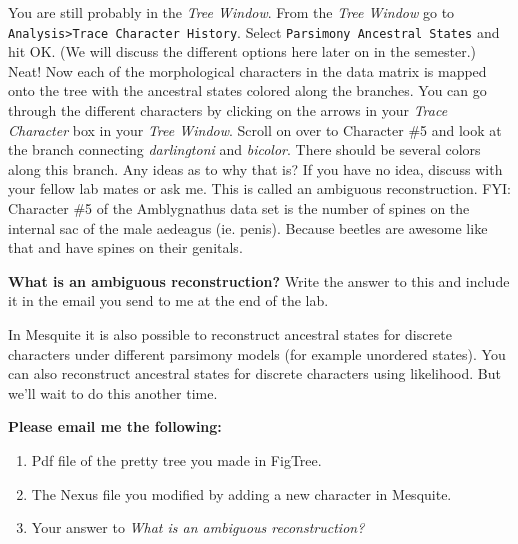 \documentclass[11pt]{article}
\begin{document}
You are still probably in the \textit{Tree Window}. From the \textit{Tree Window} go to 
\texttt{Analysis>Trace Character History}. Select \texttt{Parsimony Ancestral States} and hit OK. 
(We will discuss the different options here later on in the semester.) 
Neat! Now each of the morphological characters in the data matrix is mapped onto the 
tree with the ancestral states colored along the branches. 
You can go through the different characters by clicking on the arrows in your 
\textit{Trace Character} box in your \textit{Tree Window}. 
Scroll on over to Character \#5 and look at the branch connecting \textit{darlingtoni} and \textit{bicolor}. 
There should be several colors along this branch. Any ideas as to why that is? 
If you have no idea, discuss with your fellow lab mates or ask me. 
This is called an ambiguous reconstruction. 
FYI: Character \#5 of the Amblygnathus data set is the number of 
spines on the internal sac of the male aedeagus (ie. penis). 
Because beetles are awesome like that and have spines on their genitals.

\textbf{What is an ambiguous reconstruction?} Write the answer to this and include it in the email you send to me
at the end of the lab.

In Mesquite it is also possible to reconstruct ancestral states for discrete characters 
under different parsimony models (for example unordered states).
You can also reconstruct ancestral states for discrete characters using likelihood. But we’ll wait to do this another time.

\begin{framed}
\noindent
\textbf{Please email me the following:}
\begin{enumerate}
  \item Pdf file of the pretty tree you made in FigTree.
  \item The Nexus file you modified by adding a new character in Mesquite. 
  \item Your answer to \textit{What is an ambiguous reconstruction?}
\end{enumerate}
\end{framed}

\printbibliography
\end{document}
